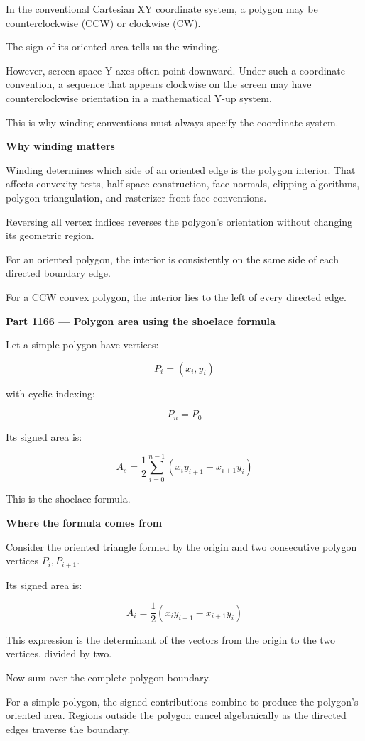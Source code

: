 In the conventional Cartesian XY coordinate system, a polygon may be counterclockwise (CCW) or clockwise (CW).

The sign of its oriented area tells us the winding.

However, screen-space Y axes often point downward. Under such a coordinate convention, a sequence that appears clockwise on the screen may have counterclockwise orientation in a mathematical Y-up system.

This is why winding conventions must always specify the coordinate system.

\textbf{Why winding matters}

Winding determines which side of an oriented edge is the polygon interior. That affects convexity tests, half-space construction, face normals, clipping algorithms, polygon triangulation, and rasterizer front-face conventions.

Reversing all vertex indices reverses the polygon's orientation without changing its geometric region.

For an oriented polygon, the interior is consistently on the same side of each directed boundary edge.

For a CCW convex polygon, the interior lies to the left of every directed edge.

\textbf{Part 1166 --- Polygon area using the shoelace formula}

Let a simple polygon have vertices:

\[
P_i=(x_i,y_i)
\]

with cyclic indexing:

\[
P_n=P_0
\]

Its signed area is:

\[
\boxed{ A_s= \frac12 \sum_{i=0}^{n-1} (x_iy_{i+1}-x_{i+1}y_i) }
\]

This is the shoelace formula.

\textbf{Where the formula comes from}

Consider the oriented triangle formed by the origin and two consecutive polygon vertices \(P_i,P_{i+1}\).

Its signed area is:

\[
A_i=\frac12(x_iy_{i+1}-x_{i+1}y_i)
\]

This expression is the determinant of the vectors from the origin to the two vertices, divided by two.

Now sum over the complete polygon boundary.

For a simple polygon, the signed contributions combine to produce the polygon's oriented area. Regions outside the polygon cancel algebraically as the directed edges traverse the boundary.

